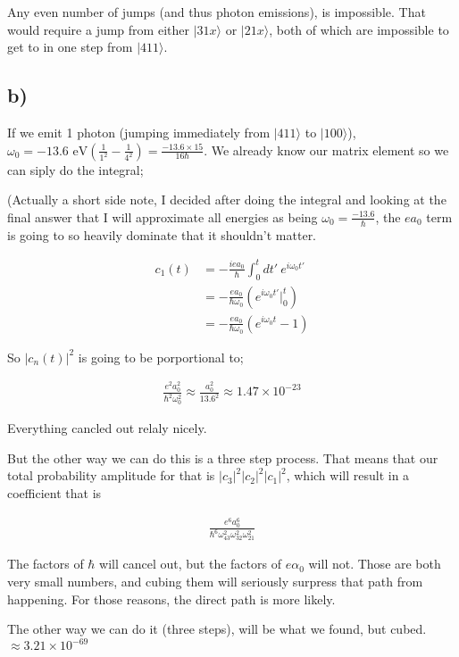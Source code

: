 \documentclass{article}
\newcommand{\p}[1]{\left(#1\right)}
\newcommand{\bra}[1]{|#1\rangle}
\begin{document}
Any even number of jumps (and thus photon emissions), is impossible. That would require a jump from either $\bra{31x}$ or $\bra{21x}$, both of which are impossible to get to in one step from $\bra{411}$.

\subsection*{b)}

If we emit 1 photon (jumping immediately from $\bra{411}$ to $\bra{100}$), $\omega_0=-13.6\text{ eV}\p{\frac{1}{1^2}-\frac{1}{4^2}}=\frac{-13.6\times15}{16\hbar}$. We already know our matrix element so we can siply do the integral;

(Actually a short side note, I decided after doing the integral and looking at the final answer that I will approximate all energies as being $\omega_0=\frac{-13.6}{\hbar}$, the $ea_0$ term is going to so heavily dominate that it shouldn't matter.

\begin{align*}
    c_1(t)&=-\frac{iea_0}{\hbar}\int_{0}^{t}dt'\:e^{i\omega_0{t}'}\\[1em]
    &=-\frac{ea_0}{\hbar\omega_0}\p{e^{i\omega_0t'}|_0^{t}}\\[1em]
    &=-\frac{ea_0}{\hbar\omega_0}\p{e^{i\omega_0t}-1}
\end{align*}

So $|c_n(t)|^2$ is going to be porportional to;
    
\begin{align*}
    \frac{e^2a_0^2}{\hbar^2\omega_0^2}\approx\frac{{a_0^2}}{13.6^2}\approx1.47\times10^{-23}
\end{align*}

Everything cancled out relaly nicely.


But the other way we can do this is a three step process. That means that our total probability amplitude for that is $|c_3|^2|c_2|^2|c_1|^2$, which will result in a coefficient that is

\begin{align*}
    \frac{e^6a_0^6}{\hbar^6\omega_{43}^2\omega_{32}^2\omega_{21}^2}
\end{align*}

The factors of $\hbar$ will cancel out, but the factors of $e\alpha_0$ will not. Those are both very small numbers, and cubing them will seriously surpress that path from happening. For those reasons, the direct path is more likely.

The other way we can do it (three steps), will be what we found, but cubed. $\approx3.21\times10^{-69}$
\end{document}
